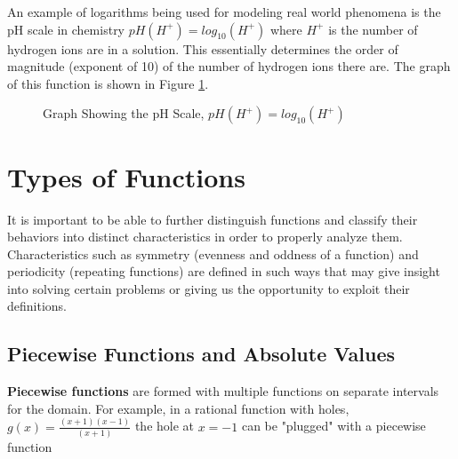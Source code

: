         \begin{example}
            An example of logarithms being used for modeling real world phenomena is the pH scale in chemistry $pH(H^+) = log_{10}(H^+)$ where $H^+$ is the number of hydrogen ions are in a solution. This essentially determines the order of magnitude (exponent of 10) of the number of hydrogen ions there are. The graph of this function is shown in Figure \ref{fig:pHgraph}.

            \begin{figure}
                \centering
                \caption{Graph Showing the pH Scale, $pH(H^+) = log_{10}(H^+)$}
                \label{fig:pHgraph}
            \end{figure}

        \end{example}

        \section{Types of Functions}\label{sect:types of functions}
        It is important to be able to further distinguish functions and classify their behaviors into distinct characteristics in order to properly analyze them. Characteristics such as symmetry (evenness and oddness of a function) and periodicity (repeating functions) are defined in such ways that may give insight into solving certain problems or giving us the opportunity to exploit their definitions.

        \subsection{Piecewise Functions and Absolute Values}
        \label{sect:piecewise functions and absolute values}
        \textbf{Piecewise functions} are formed with multiple functions on separate intervals for the domain. For example, in a rational function with holes, $g(x) = \frac{(x+1)(x-1)}{(x+1)}$ the hole at $x = -1$ can be "plugged" with a piecewise function

